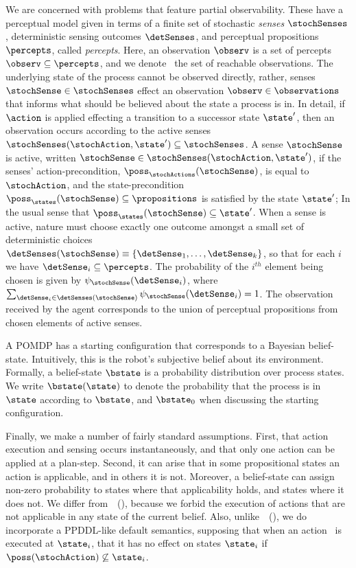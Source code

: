 \documentclass[letterpaper]{article}
\begin{document}
We are concerned with problems that feature partial
observability. These have a perceptual model given in terms of a
finite set of stochastic {\em senses} $\stochSenses$, deterministic
sensing outcomes $\detSenses$, and perceptual propositions
$\percepts$, called {\em percepts}. Here, an observation $\observ$ is
a set of percepts $\observ \subseteq \percepts$, and we denote
\observations\ the set of reachable observations. The underlying state
of the process cannot be observed directly, rather, senses
$\stochSense \in \stochSenses$ effect an observation $\observ \in
\observations$ that informs what should be believed about the state a
process is in. In detail, if $\action$ is applied effecting a
transition to a successor state $\state'$, then an observation occurs
according to the active senses $\stochSenses(\stochAction, \state')
\subseteq \stochSenses$. A sense $\stochSense$ is active, written
$\stochSense \in \stochSenses(\stochAction, \state')$, if the senses'
action-precondition, $\poss_\stochActions(\stochSense)$, is equal to
$\stochAction$, and the state-precondition $\poss_\states(\stochSense)
\subseteq \propositions$ is satisfied by the state $\state'$; In the
usual sense that $\poss_\states(\stochSense) \subseteq \state'$.
When a sense is active, nature must choose exactly one outcome amongst
a small set of deterministic choices $\detSenses(\stochSense)
\equiv \{\detSense_1, \ldots, \detSense_k \}$, so that for each
$i$ we have $\detSense_i \subseteq \percepts$. The probability of
the $i^{th}$ element being chosen is given by
$\psi_{\stochSense}(\detSense_i)$, where $\sum_{\detSense_i \in
\detSenses(\stochSense)} \psi_{\stochSense}(\detSense_i) =
1$. The observation received by the agent corresponds to the union of
perceptual propositions from chosen elements of active senses.

A POMDP has a starting configuration that corresponds to a Bayesian
belief-state. Intuitively, this is the robot's subjective belief about
its environment. Formally, a belief-state $\bstate$ is a probability
distribution over process states. We write $\bstate(\state)$ to denote
the probability that the process is in $\state$ according to
$\bstate$, and $\bstate_0$ when discussing the starting
configuration. 

Finally, we make a number of fairly standard assumptions. First, that
action execution and sensing occurs instantaneously, and that only one
action can be applied at a plan-step. Second, it can arise that in
some propositional states an action is applicable, and in others it is
not. Moreover, a belief-state can assign non-zero probability to
states where that applicability holds, and states where it does
not. We differ
from~\citeauthor{younes:littman:04}~(\citeyear{younes:littman:04}),
because we forbid the execution of actions that are not applicable in
any state of the current belief.  Also,
unlike~\citeauthor{hoffmann:brafman:2006}~(\citeyear{hoffmann:brafman:2006}),
we do incorporate a PPDDL-like default semantics, supposing that when
an action \stochAction\ is executed at $\state_i$, that it has no
effect on states $\state_i$ if $\poss(\stochAction) \not\subseteq
\state_i$.
\end{document}
